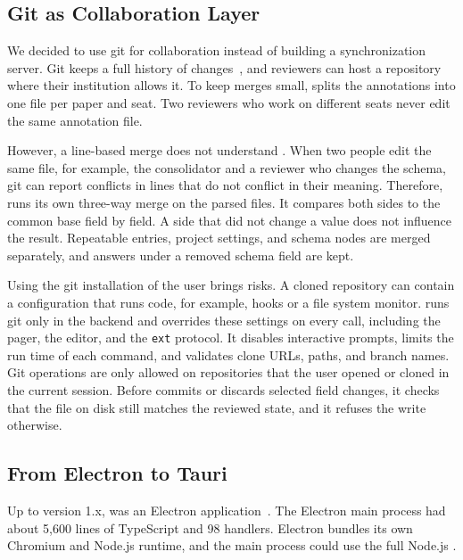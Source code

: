 \subsection{Git as Collaboration Layer}\label{sec:architecture-git}

We decided to use git for collaboration instead of building a synchronization server.
Git keeps a full history of changes~\cite{ram2013git}, and reviewers can host a repository where their institution allows it.
To keep merges small, \SaiLoR splits the annotations into one file per paper and seat.
Two reviewers who work on different seats never edit the same annotation file.

However, a line-based merge does not understand \JSON.
When two people edit the same file, for example, the consolidator and a reviewer who changes the schema, git can report conflicts in lines that do not conflict in their meaning.
Therefore, \SaiLoR runs its own three-way merge on the parsed files.
It compares both sides to the common base field by field.
A side that did not change a value does not influence the result.
Repeatable entries, project settings, and schema nodes are merged separately, and answers under a removed schema field are kept.

Using the git installation of the user brings risks.
A cloned repository can contain a configuration that runs code, for example, hooks or a file system monitor.
\SaiLoR runs git only in the backend and overrides these settings on every call, including the pager, the editor, and the \texttt{ext} protocol.
It disables interactive prompts, limits the run time of each command, and validates clone URLs, paths, and branch names.
Git operations are only allowed on repositories that the user opened or cloned in the current session.
Before \SaiLoR commits or discards selected field changes, it checks that the file on disk still matches the reviewed state, and it refuses the write otherwise.

\subsection{From Electron to Tauri}\label{sec:architecture-tauri}

Up to version 1.x, \SaiLoR was an Electron application~\cite{electron}.
The Electron main process had about 5,600 lines of TypeScript and 98 \IPC handlers.
Electron bundles its own Chromium and Node.js runtime, and the main process could use the full Node.js \API.

